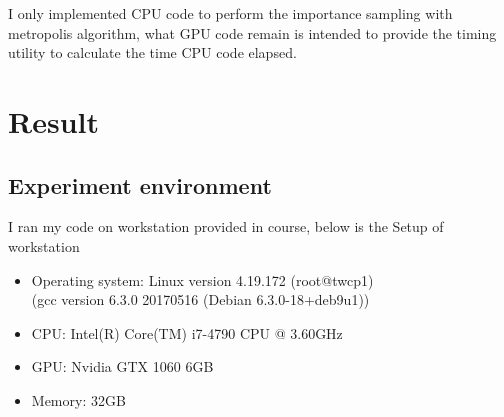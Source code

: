 \documentclass{article}
\begin{document}
	I only implemented CPU code to perform the importance sampling with metropolis algorithm, what GPU code remain is intended to provide the timing utility to calculate the time CPU code elapsed.

	\section{Result}
	\subsection{Experiment environment}
	I ran my code on workstation provided in course, below is the Setup of workstation
	\begin{itemize}
		\item Operating system: Linux version 4.19.172 (root@twcp1)\\(gcc version 6.3.0 20170516 (Debian 6.3.0-18+deb9u1))
		\item CPU: Intel(R) Core(TM) i7-4790 CPU @ 3.60GHz
		\item GPU: Nvidia GTX 1060 6GB
		\item Memory: 32GB 
	\end{itemize}
\end{document}
